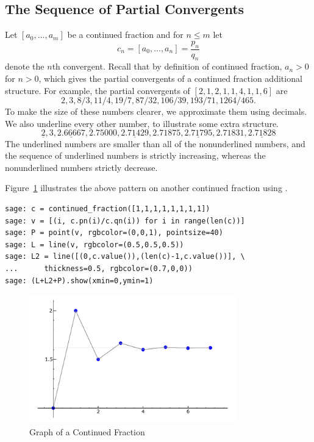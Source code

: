 \subsection{The Sequence of Partial Convergents}
Let $[a_0,\ldots, a_m]$ be a continued fraction and for
$n\leq m$ let
$$
  c_n = [a_0, \ldots, a_n] = \frac{p_n}{q_n}
$$
denote the $n$th convergent.  Recall that by definition of continued
fraction, $a_n>0$ for $n>0$, which gives the partial convergents of a
continued fraction additional structure.  For example, the partial
convergents of $[2, 1, 2, 1, 1, 4, 1, 1, 6]$ are
$$
2, 3, 8/3, 11/4, 19/7, 87/32, 106/39, 193/71, 1264/465.
$$
To make the size of these numbers clearer, we approximate
them using decimals.  We also underline every other number,
to illustrate some extra structure.
$$
 \underline{2}, 3,  \underline{2.66667}, 2.75000,  \underline{2.71429},
2.71875,  \underline{2.71795}, 2.71831,  \underline{2.71828}
$$
The underlined numbers are smaller than all of the
nonunderlined numbers, and the sequence of underlined numbers is
strictly increasing, whereas the nonunderlined numbers strictly
decrease.
\begin{sg}
  Figure~\ref{fig:cf} illustrates the above pattern on
  another continued fraction using \sage.
\begin{verbatim}
sage: c = continued_fraction([1,1,1,1,1,1,1,1])
sage: v = [(i, c.pn(i)/c.qn(i)) for i in range(len(c))]
sage: P = point(v, rgbcolor=(0,0,1), pointsize=40)
sage: L = line(v, rgbcolor=(0.5,0.5,0.5))
sage: L2 = line([(0,c.value()),(len(c)-1,c.value())], \
...      thickness=0.5, rgbcolor=(0.7,0,0))
sage: (L+L2+P).show(xmin=0,ymin=1)
\end{verbatim}
\end{sg}
\begin{figure}
\begin{center}
\includegraphics[width=0.8\textwidth]{graphics/cfbounce}
\end{center}
\caption{Graph of a Continued Fraction\label{fig:cf}}
\end{figure}

